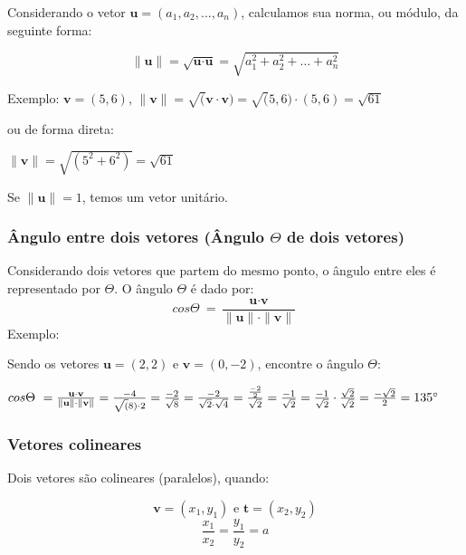 \documentclass[12pt]{article}
\begin{document}
Considerando o vetor \(\textbf{u} = (a_{1}, a_{2}, ..., a_{n})\), calculamos sua norma, ou módulo, da seguinte forma\cite{anton2012algebra, lipschutz-algebra}:

\begin{equation}
\|\textbf{u}\| = \sqrt{\textbf{u} \cdot \textbf{u}} = \sqrt{a_{1}^2 + a_{2}^2 + ... + a_{n}^2} 
\end{equation}

Exemplo: \(\textbf{v} = (5, 6)\), \(\|\textbf{v}\| = \sqrt(\textbf{v} \cdot \textbf{v}) = \sqrt(5,6) \cdot (5,6) = \sqrt{61}\)

ou de forma direta:

\(\|\textbf{v}\| = \sqrt{(5^2+6^2)} = \sqrt{61}\)


Se \(\|\textbf{u}\| = 1\), temos um vetor unitário.

\subsubsection{Ângulo entre dois vetores (Ângulo $\Theta$ de dois vetores)}

Considerando dois vetores que partem do mesmo ponto, o ângulo entre eles é representado por $\Theta$. O ângulo $\Theta$ é dado por:
\begin{equation}
cos \Theta\ = \frac{\textbf{u}  \cdot  \textbf{v}}{\|\textbf{u}\| \cdot \|\textbf{v}\|}
\end{equation}
Exemplo:

Sendo os vetores \(\textbf{u} = (2,2)\) e \(\textbf{v}=(0, -2)\), encontre o ângulo $\Theta$:

\(cos \Theta\ = \frac{\textbf{u}  \cdot  \textbf{v}}{\|\textbf{u}\| \cdot \|\textbf{v}\|} = \frac{-4}{\sqrt(8) \cdot 2} = \frac{-2}{\sqrt{8}}=\frac{-2}{\sqrt{2} \cdot \sqrt{4}}=\frac{\frac{-2}{2}}{\sqrt{2}} = \frac{-1}{\sqrt{2}} = \frac{-1}{\sqrt{2}}  \cdot  \frac{\sqrt{2}}{\sqrt{2}} = \frac{-\sqrt{2}}{2} = 135\degree\)

\subsubsection{Vetores colineares}

Dois vetores são colineares (paralelos), quando:





\begin{equation}
		\textbf{v} = (x_{1}, y_{1}) \text{ e } \textbf{t} = (x_{2}, y_{2})
\end{equation}
\begin{equation}
\frac{x_{1}}{x_{2}} = \frac{y_{1}}{y_{2}} = \textit{a}	
\end{equation}
\end{document}

